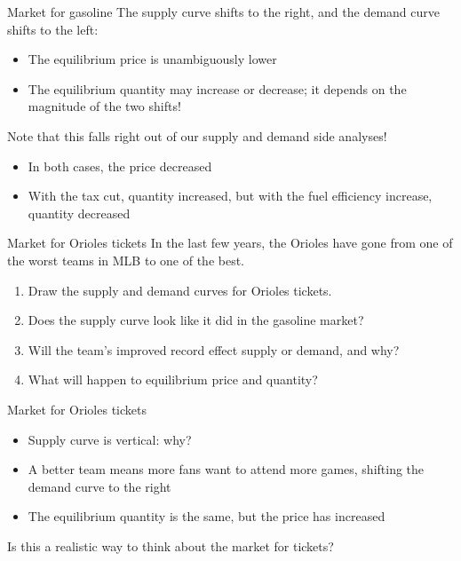 \documentclass[compress]{beamer}
\begin{document}
\begin{frame}{Market for gasoline}
    The supply curve shifts to the right, and the demand curve shifts to the left:
    \begin{itemize}
        \item The equilibrium price is unambiguously lower
        \item The equilibrium quantity may increase or decrease; it depends on the magnitude of the two shifts!
    \end{itemize}
\medskip
\medskip
    Note that this falls right out of our supply and demand side analyses!
    \begin{itemize}
        \item In both cases, the price decreased
        \item With the tax cut, quantity increased, but with the fuel efficiency increase, quantity decreased
    \end{itemize}


\end{frame}

\begin{frame}{Market for Orioles tickets}
    In the last few years, the Orioles have gone from one of the worst teams in MLB to one of the best.

    \begin{enumerate}
        \item Draw the supply and demand curves for Orioles tickets.
        \item Does the supply curve look like it did in the gasoline market?
        \item Will the team's improved record effect supply or demand, and why?
        \item What will happen to equilibrium price and quantity?
    \end{enumerate}
\end{frame}

\begin{frame}{Market for Orioles tickets}
    \begin{itemize}
        \item Supply curve is vertical: why?
        \item A better team means more fans want to attend more games, shifting the demand curve to the right
        \item The equilibrium quantity is the same, but the price has increased
    \end{itemize}

    Is this a realistic way to think about the market for tickets?
\end{frame}
\end{document}
